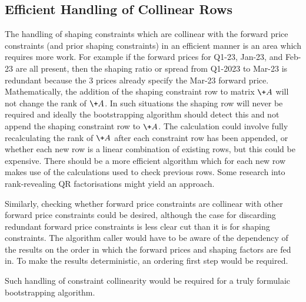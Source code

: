 \documentclass{article}
\begin{document}
\subsection{Efficient Handling of Collinear Rows}
The handling of shaping constraints which are collinear with the forward price constraints
(and prior shaping constraints) in an efficient manner is an area which requires more work. 
For example if the forward
prices for Q1-23, Jan-23, and Feb-23 are all present, then the shaping ratio or spread
from Q1-2023 to Mar-23 is redundant because the 3 prices already specify the Mar-23 
forward price. Mathematically, the addition of the shaping constraint row to matrix
$\+A$ will not change the rank of $\+A$. In such situations the shaping row will
never be required and ideally the bootstrapping algorithm should detect this and 
not append the shaping constraint row to $\+A$. The calculation could involve fully 
recalculating the rank of $\+A$ after each constraint row has been appended, or whether
each new row is a linear combination of existing rows, but this could be expensive.
There should be a more efficient algorithm which for each new row makes use of the 
calculations used to check previous rows. Some research into rank-revealing QR
factorisations might yield an approach.

Similarly, checking whether forward price constraints are collinear with other
forward price constraints could be desired, although the case for discarding
redundant forward price constraints is less clear cut than it is for shaping 
constraints.
The algorithm caller would have to be aware of the dependency of the results on
the order in which the forward prices and shaping factors are fed in. To make 
the results deterministic, an ordering first step would be required.

Such handling of constraint collinearity would be required for a truly formulaic
bootstrapping algorithm.




\end{document}
